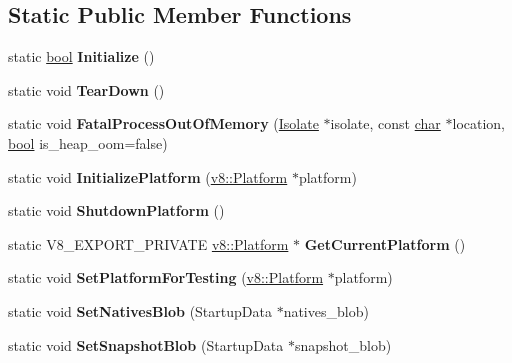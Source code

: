 \subsection*{Static Public Member Functions}
\begin{DoxyCompactItemize}
\item 
\mbox{\label{classv8_1_1internal_1_1V8_a22c0e7b7018fdef4b484c432e2725f96}} 
static \mbox{\hyperlink{classbool}{bool}} {\bfseries Initialize} ()
\item 
\mbox{\label{classv8_1_1internal_1_1V8_a216fa3810e9a2014d650162e53bc3576}} 
static void {\bfseries Tear\+Down} ()
\item 
\mbox{\label{classv8_1_1internal_1_1V8_a405dd2993d1aad0c5707425d78b9b288}} 
static void {\bfseries Fatal\+Process\+Out\+Of\+Memory} (\mbox{\hyperlink{classv8_1_1internal_1_1Isolate}{Isolate}} $\ast$isolate, const \mbox{\hyperlink{classchar}{char}} $\ast$location, \mbox{\hyperlink{classbool}{bool}} is\+\_\+heap\+\_\+oom=false)
\item 
\mbox{\label{classv8_1_1internal_1_1V8_a5f5a64c4edc23f8a5674a05038417260}} 
static void {\bfseries Initialize\+Platform} (\mbox{\hyperlink{classv8_1_1Platform}{v8\+::\+Platform}} $\ast$platform)
\item 
\mbox{\label{classv8_1_1internal_1_1V8_a04db7c30414303a26aa5b7949428b8ff}} 
static void {\bfseries Shutdown\+Platform} ()
\item 
\mbox{\label{classv8_1_1internal_1_1V8_a5eb1d47c492fa1e85e7d7c31dd5cf2bb}} 
static V8\+\_\+\+E\+X\+P\+O\+R\+T\+\_\+\+P\+R\+I\+V\+A\+TE \mbox{\hyperlink{classv8_1_1Platform}{v8\+::\+Platform}} $\ast$ {\bfseries Get\+Current\+Platform} ()
\item 
\mbox{\label{classv8_1_1internal_1_1V8_a01b0c617b00a393381659b7ef884da5a}} 
static void {\bfseries Set\+Platform\+For\+Testing} (\mbox{\hyperlink{classv8_1_1Platform}{v8\+::\+Platform}} $\ast$platform)
\item 
\mbox{\label{classv8_1_1internal_1_1V8_a6201c68cdcd687e0cc40552c0915ab1e}} 
static void {\bfseries Set\+Natives\+Blob} (Startup\+Data $\ast$natives\+\_\+blob)
\item 
\mbox{\label{classv8_1_1internal_1_1V8_a474be8cbefa4b1c26661a238d14179c0}} 
static void {\bfseries Set\+Snapshot\+Blob} (Startup\+Data $\ast$snapshot\+\_\+blob)
\end{DoxyCompactItemize}


